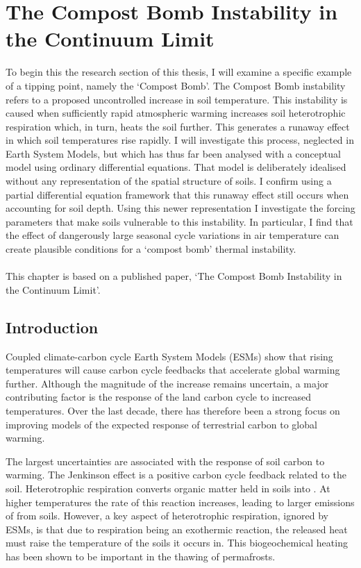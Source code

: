 \chapter{The Compost Bomb Instability in the Continuum Limit}
\label{chapter:continuous_compost_bomb}
\graphicspath{{continuous_compost_bomb/figs/}}

To begin this the research section of this thesis, I will examine a specific example of a tipping point, namely the `Compost Bomb'. The
Compost Bomb instability refers to a proposed uncontrolled increase in soil temperature. This instability is caused when sufficiently rapid
atmospheric warming increases soil heterotrophic respiration which, in turn, heats the soil further. This generates a runaway
effect in which soil temperatures rise rapidly. I will investigate this process, neglected in Earth System Models, but which has thus far been analysed with a conceptual
model using ordinary differential equations. That model is deliberately idealised without any representation of the spatial structure of soils.
I confirm using a partial differential equation framework that this runaway effect still occurs when accounting for soil depth.
Using this newer representation I investigate the forcing parameters that make soils vulnerable to this instability. In particular, I find that the effect of
dangerously large seasonal cycle variations in air temperature can create plausible conditions for a `compost bomb' thermal instability.
\\\\
This chapter is based on a published paper, `The Compost Bomb Instability in the Continuum Limit'\cite{Clarke2021}.

 \section{Introduction}
\label{section:compost_bomb_intro}
Coupled climate-carbon cycle Earth System Models (ESMs) show that rising temperatures will cause carbon cycle feedbacks that accelerate global
warming further\cite{Cox2000}. Although the magnitude of the increase remains uncertain, a major contributing factor is the
response of the land carbon cycle to increased temperatures\cite{Friedlingstein2006,Arora2020}. Over the last decade, there has therefore been a strong focus on improving
models of the expected response of terrestrial carbon to global warming.

The largest uncertainties are associated with the response of soil carbon to warming\cite{Varney2020}.
The Jenkinson effect\cite{Jenkinson1991} is a positive carbon cycle feedback related to the soil. Heterotrophic respiration converts
organic matter held in soils into . At higher temperatures the rate of this reaction increases, leading to
larger emissions of  from soils. However, a key aspect of heterotrophic respiration, ignored by ESMs\cite{Arora2020}, is that due to respiration being
an exothermic reaction, the released heat must raise the temperature of the soils it occurs in. This biogeochemical heating has been shown
to be important in the thawing of permafrosts\cite{Khvorostyanov2008,Khvorostyanov2008a}.

